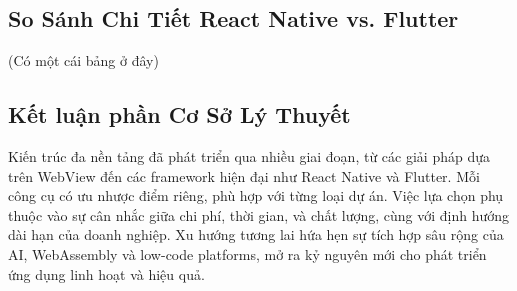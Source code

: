\subsection{So Sánh Chi Tiết React Native vs. Flutter}
\renewcommand{\labelitemi}{--}    
    \begin{flushleft}
        \hspace*{0.8cm}(Có một cái bảng ở đây)
    \end{flushleft}

\subsection{Kết luận phần Cơ Sở Lý Thuyết}
\renewcommand{\labelitemi}{--}    
    \begin{flushleft}
        \hspace*{0.8cm}Kiến trúc đa nền tảng đã phát triển qua nhiều giai đoạn, từ các giải pháp dựa trên WebView đến các framework hiện đại như React Native và Flutter. Mỗi công cụ có ưu nhược điểm riêng, phù hợp với từng loại dự án. Việc lựa chọn phụ thuộc vào sự cân nhắc giữa chi phí, thời gian, và chất lượng, cùng với định hướng dài hạn của doanh nghiệp. Xu hướng tương lai hứa hẹn sự tích hợp sâu rộng của AI, WebAssembly và low-code platforms, mở ra kỷ nguyên mới cho phát triển ứng dụng linh hoạt và hiệu quả.
    \end{flushleft}